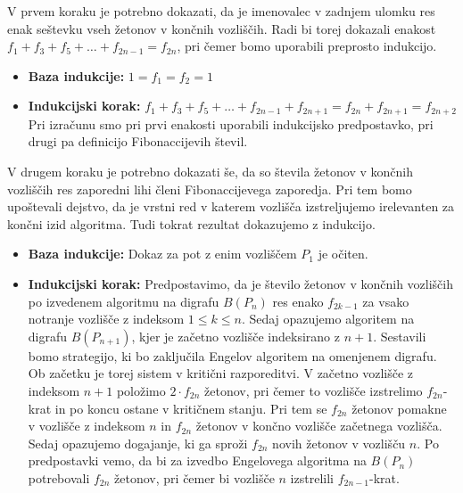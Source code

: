\documentclass[twoside,11pt]{article}
\begin{document}
\begin{dokaz}
V prvem koraku je potrebno dokazati, da je imenovalec v zadnjem ulomku res enak seštevku vseh žetonov v končnih vozliščih. 
Radi bi torej dokazali enakost $f_1+f_3+f_5+\ldots+f_{2n-1}=f_{2n}$, pri čemer bomo uporabili preprosto indukcijo.
\begin{itemize}
    \item [] \textbf{Baza indukcije:} \quad $1=f_1=f_2=1$
    \item [] \textbf{Indukcijski korak:} \quad $f_1+f_3+f_5+\ldots+f_{2n-1}+f_{2n+1} = f_{2n} + f_{2n+1} = f_{2n+2}$ \\
    Pri izračunu smo pri prvi enakosti uporabili indukcijsko predpostavko, pri drugi pa definicijo Fibonaccijevih števil.
\end{itemize}

\noindent V drugem koraku je potrebno dokazati še, da so števila žetonov v končnih vozliščih res zaporedni lihi členi
Fibonaccijevega zaporedja. Pri tem bomo upoštevali dejstvo, da je vrstni red v katerem vozlišča izstreljujemo irelevanten za končni izid algoritma.
Tudi tokrat rezultat dokazujemo z indukcijo.
\begin{itemize}
    \item [] \textbf{Baza indukcije:} Dokaz za pot z enim vozliščem $P_1$ je očiten.
    \item [] \textbf{Indukcijski korak:} Predpostavimo, da je število žetonov v končnih vozliščih po izvedenem algoritmu na 
    digrafu $B(P_{n})$ res enako $f_{2k-1}$ za vsako notranje vozlišče z indeksom $1\le k\le n$. 
    Sedaj opazujemo algoritem na digrafu $B(P_{n+1})$, kjer je začetno vozlišče indeksirano z $n+1$. Sestavili bomo strategijo, 
    ki bo zaključila Engelov algoritem na omenjenem digrafu. Ob začetku je torej sistem v kritični razporeditvi.
    V začetno vozlišče z indeksom $n+1$ položimo $2\cdot f_{2n}$ žetonov, pri čemer to vozlišče izstrelimo $f_{2n}$-krat in 
    po koncu ostane v kritičnem stanju. Pri tem se $f_{2n}$ žetonov pomakne v vozlišče z indeksom $n$ in $f_{2n}$ žetonov v končno vozlišče začetnega vozlišča.
    Sedaj opazujemo dogajanje, ki ga sproži $f_{2n}$ novih žetonov v vozlišču $n$. Po predpostavki vemo, da bi za izvedbo Engelovega algoritma na $B(P_{n})$ potrebovali $f_{2n}$ žetonov, pri čemer bi vozlišče $n$ izstrelili $f_{2n-1}$-krat. 

\end{itemize}
\end{dokaz}
\end{document}
